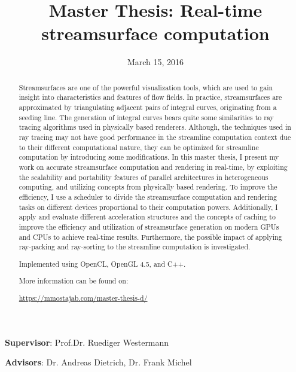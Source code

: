 \documentclass[]{article}
\title{Master Thesis: Real-time streamsurface computation}
\date{March 15, 2016}
\begin{document}
\maketitle

\begin{description}
	\centering
	\item[] \textbf{Supervisor}: Prof.Dr. Ruediger Westermann
	\item[] \textbf{Advisors}: Dr. Andreas Dietrich, Dr. Frank Michel\newline{}%
\end{description}


\begin{abstract}

Streamsurfaces are one of the powerful visualization tools, which are used to gain insight into characteristics and features of flow fields. In practice, streamsurfaces are approximated by triangulating adjacent pairs of integral curves, originating from a seeding line. The generation of integral curves bears quite some similarities to ray tracing algorithms used in physically based renderers. Although, the techniques used in ray tracing may not have good performance in the streamline computation context due to their different computational nature, they can be optimized for streamline computation by introducing some modifications. In this master thesis, I present my work on accurate streamsurface computation and rendering in real-time, by exploiting the scalability and portability features of parallel architectures in heterogeneous computing, and utilizing concepts from physically based rendering. To improve the efficiency, I use a scheduler to divide the streamsurface computation and rendering tasks on different devices proportional to their computation powers. Additionally, I apply and evaluate different acceleration structures and the concepts of caching to improve the efficiency and utilization of streamsurface generation on modern GPUs and CPUs to achieve real-time results. Furthermore, the possible impact of applying ray-packing and ray-sorting to the streamline computation is investigated.\newline

Implemented using OpenCL, OpenGL 4.5, and C++.\newline

More information can be found on:\

\href{https://mmostajab.com/master-thesis-d/}{https://mmostajab.com/master-thesis-d/}

\end{abstract}
\end{document}

